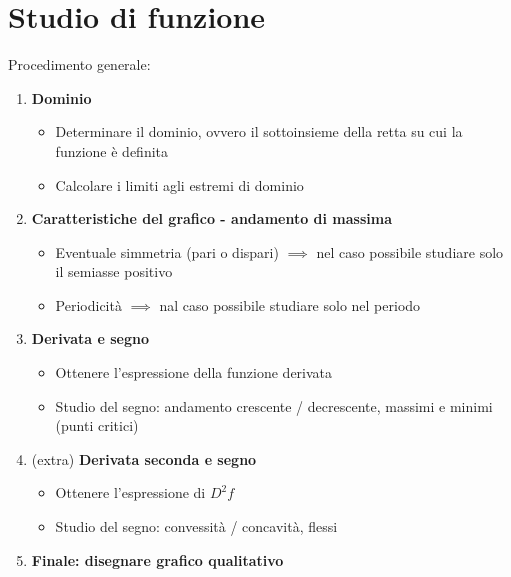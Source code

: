 \documentclass[10pt]{article}
\theoremstyle{plain}
\begin{document}
\section{Studio di funzione}
Procedimento generale:
\begin{enumerate}
    \item \textbf{Dominio} 
    \begin{itemize}
    \item Determinare il dominio, ovvero il sottoinsieme della retta su cui la funzione è definita 
    \item Calcolare i limiti agli estremi di dominio
    \end{itemize}
    \item \textbf{Caratteristiche del grafico - andamento di massima}
    \begin{itemize}
        \item Eventuale simmetria (pari o dispari) $\implies$ nel caso possibile studiare solo il semiasse positivo 
        \item Periodicità $\implies$ nal caso possibile studiare solo nel periodo
    \end{itemize}
    \item \textbf{Derivata e segno}
    \begin{itemize}
        \item Ottenere l'espressione della funzione derivata
        \item Studio del segno: andamento crescente / decrescente, massimi e minimi (punti critici)
    \end{itemize}
    \item (extra) \textbf{Derivata seconda e segno}
    \begin{itemize}
        \item Ottenere l'espressione di $D^2f$
        \item Studio del segno: convessità / concavità, flessi
    \end{itemize}
    \item \textbf{Finale: disegnare grafico qualitativo}
\end{enumerate}
\end{document}
